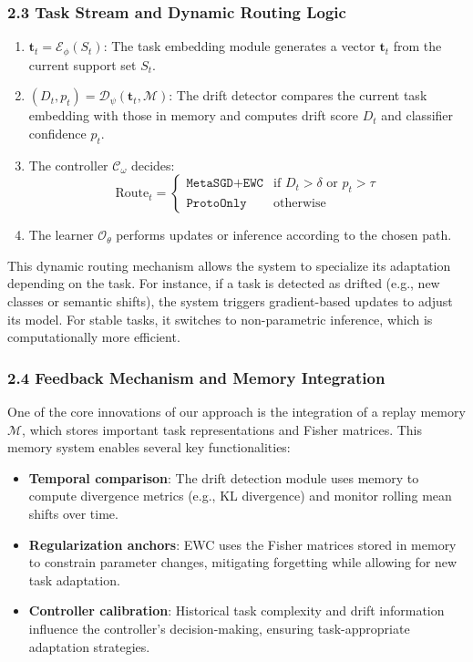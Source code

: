 \documentclass[conference]{IEEEtran}
\begin{document}
\subsubsection*{2.3 Task Stream and Dynamic Routing Logic}


\begin{enumerate}
    \item $\mathbf{t}_t = \mathcal{E}_\phi(S_t)$: The task embedding module generates a vector $\mathbf{t}_t$ from the current support set $S_t$.
    \item $(D_t, p_t) = \mathcal{D}_\psi(\mathbf{t}_t, \mathcal{M})$: The drift detector compares the current task embedding with those in memory and computes drift score $D_t$ and classifier confidence $p_t$.
    \item The controller $\mathcal{C}_\omega$ decides:  
        \[
        \text{Route}_t = 
        \begin{cases}
        \texttt{MetaSGD+EWC} & \text{if } D_t > \delta \text{ or } p_t > \tau \\
        \texttt{ProtoOnly} & \text{otherwise}
        \end{cases}
        \]
    \item The learner $\mathcal{O}_\theta$ performs updates or inference according to the chosen path.
\end{enumerate}

This dynamic routing mechanism allows the system to specialize its adaptation depending on the task. For instance, if a task is detected as drifted (e.g., new classes or semantic shifts), the system triggers gradient-based updates to adjust its model. For stable tasks, it switches to non-parametric inference, which is computationally more efficient.

\subsubsection*{2.4 Feedback Mechanism and Memory Integration}

One of the core innovations of our approach is the integration of a replay memory $\mathcal{M}$, which stores important task representations and Fisher matrices. This memory system enables several key functionalities:
\begin{itemize}
    \item \textbf{Temporal comparison}: The drift detection module uses memory to compute divergence metrics (e.g., KL divergence) and monitor rolling mean shifts over time.
    \item \textbf{Regularization anchors}: EWC uses the Fisher matrices stored in memory to constrain parameter changes, mitigating forgetting while allowing for new task adaptation.
    \item \textbf{Controller calibration}: Historical task complexity and drift information influence the controller’s decision-making, ensuring task-appropriate adaptation strategies.
\end{itemize}
\end{document}
